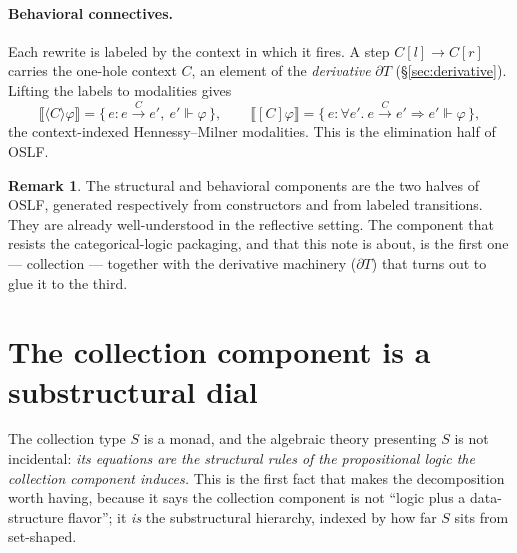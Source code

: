 \documentclass[11pt]{article}
\theoremstyle{definition}
\newtheorem{remark}[definition]{Remark}
\theoremstyle{plain}
\newcommand{\p}{\partial}
\newcommand{\T}{T}
\newcommand{\Coll}{S}
\newcommand{\sem}[1]{\llbracket #1 \rrbracket}
\newcommand{\real}{\Vdash}
\begin{document}
\paragraph{Behavioral connectives.}
Each rewrite is labeled by the context in which it fires. A step
$C[l] \to C[r]$ carries the one-hole context $C$, an element of the
\emph{derivative} $\p\T$ (\S\ref{sec:derivative}). Lifting the labels to
modalities gives
\[
  \sem{\langle C\rangle \varphi}
  = \{\, e : e \xrightarrow{\,C\,} e',\ e' \real \varphi \,\},
  \qquad
  \sem{[C]\varphi}
  = \{\, e : \forall e'.\ e \xrightarrow{\,C\,} e' \Rightarrow e' \real \varphi \,\},
\]
the context-indexed Hennessy--Milner modalities. This is the elimination half
of OSLF.

\begin{remark}
The structural and behavioral components are the two halves of OSLF, generated
respectively from constructors and from labeled transitions. They are already
well-understood in the reflective setting. The component that resists the
categorical-logic packaging, and that this note is about, is the first one ---
collection --- together with the derivative machinery ($\p\T$) that turns out
to glue it to the third.
\end{remark}

\section{The collection component is a substructural dial}
\label{sec:dial}

The collection type $\Coll$ is a monad, and the algebraic theory presenting
$\Coll$ is not incidental: \emph{its equations are the structural rules of the
propositional logic the collection component induces.} This is the first fact
that makes the decomposition worth having, because it says the collection
component is not ``logic plus a data-structure flavor''; it \emph{is} the
substructural hierarchy, indexed by how far $\Coll$ sits from set-shaped.
\end{document}
